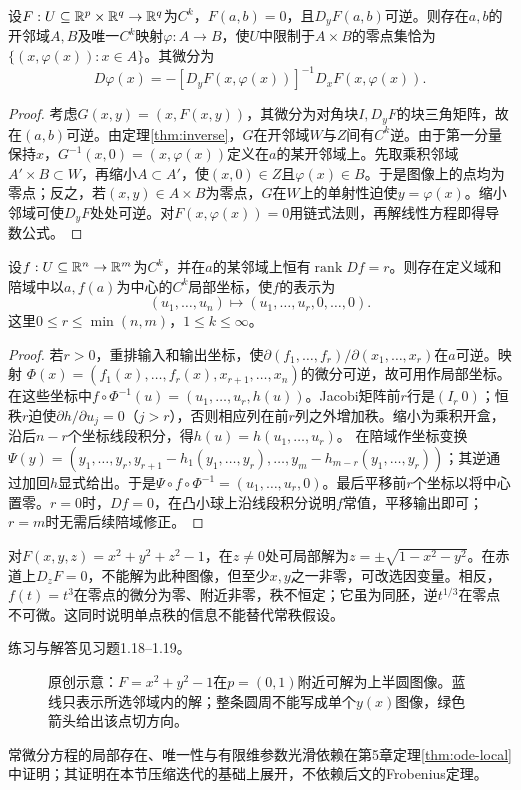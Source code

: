 \begin{theorem}[隐映射定理]\label{thm:implicit}
设$F:U\subseteq\mathbb{R}^p\times\mathbb{R}^q\to\mathbb{R}^q$为$C^k$，$F(a,b)=0$，且$D_yF(a,b)$可逆。则存在$a,b$的开邻域$A,B$及唯一$C^k$映射$\varphi:A\to B$，使$U$中限制于$A\times B$的零点集恰为$\{(x,\varphi(x)):x\in A\}$。其微分为
\[
 D\varphi(x)=-[D_yF(x,\varphi(x))]^{-1}D_xF(x,\varphi(x)).
\]
\end{theorem}
\begin{proof}
考虑$G(x,y)=(x,F(x,y))$，其微分为对角块$I,D_yF$的块三角矩阵，故在$(a,b)$可逆。由定理\ref{thm:inverse}，$G$在开邻域$W$与$Z$间有$C^k$逆。由于第一分量保持$x$，$G^{-1}(x,0)=(x,\varphi(x))$定义在$a$的某开邻域上。先取乘积邻域$A'\times B\subset W$，再缩小$A\subset A'$，使$(x,0)\in Z$且$\varphi(x)\in B$。于是图像上的点均为零点；反之，若$(x,y)\in A\times B$为零点，$G$在$W$上的单射性迫使$y=\varphi(x)$。缩小邻域可使$D_yF$处处可逆。对$F(x,\varphi(x))=0$用链式法则，再解线性方程即得导数公式。
\end{proof}
\begin{theorem}[常秩定理]\label{thm:constant-rank}
设$f:U\subseteq\mathbb{R}^n\to\mathbb{R}^m$为$C^k$，并在$a$的某邻域上恒有$\operatorname{rank}Df=r$。则存在定义域和陪域中以$a,f(a)$为中心的$C^k$局部坐标，使$f$的表示为
\[
 (u_1,\ldots,u_n)\longmapsto(u_1,\ldots,u_r,0,\ldots,0).
\]
这里$0\leq r\leq\min(n,m)$，$1\leq k\leq\infty$。
\end{theorem}
\begin{proof}
若$r>0$，重排输入和输出坐标，使$\partial(f_1,\ldots,f_r)/\partial(x_1,\ldots,x_r)$在$a$可逆。映射
$\Phi(x)=(f_1(x),\ldots,f_r(x),x_{r+1},\ldots,x_n)$的微分可逆，故可用作局部坐标。在这些坐标中$f\circ\Phi^{-1}(u)=(u_1,\ldots,u_r,h(u))$。Jacobi矩阵前$r$行是$(I_r\ 0)$；恒秩$r$迫使$\partial h/\partial u_j=0$（$j>r$），否则相应列在前$r$列之外增加秩。缩小为乘积开盒，沿后$n-r$个坐标线段积分，得$h(u)=h(u_1,\ldots,u_r)$。
在陪域作坐标变换$\Psi(y)=(y_1,\ldots,y_r,y_{r+1}-h_1(y_1,\ldots,y_r),\ldots,y_m-h_{m-r}(y_1,\ldots,y_r))$；其逆通过加回$h$显式给出。于是$\Psi\circ f\circ\Phi^{-1}=(u_1,\ldots,u_r,0)$。最后平移前$r$个坐标以将中心置零。$r=0$时，$Df=0$，在凸小球上沿线段积分说明$f$常值，平移输出即可；$r=m$时无需后续陪域修正。
\end{proof}
\begin{example}[球面与假设的边界]
对$F(x,y,z)=x^2+y^2+z^2-1$，在$z\ne0$处可局部解为$z=\pm\sqrt{1-x^2-y^2}$。在赤道上$D_zF=0$，不能解为此种图像，但至少$x,y$之一非零，可改选因变量。相反，$f(t)=t^3$在零点的微分为零、附近非零，秩不恒定；它虽为同胚，逆$t^{1/3}$在零点不可微。这同时说明单点秩的信息不能替代常秩假设。
\end{example}
练习与解答见习题1.18--1.19。
\begin{figure}[htbp]
\centering

\caption{原创示意：$F=x^2+y^2-1$在$p=(0,1)$附近可解为上半圆图像。蓝线只表示所选邻域内的解；整条圆周不能写成单个$y(x)$图像，绿色箭头给出该点切方向。}
\label{fig:implicit-graph}
\end{figure}

常微分方程的局部存在、唯一性与有限维参数光滑依赖在第5章定理\ref{thm:ode-local}中证明；其证明在本节压缩迭代的基础上展开，不依赖后文的Frobenius定理。
